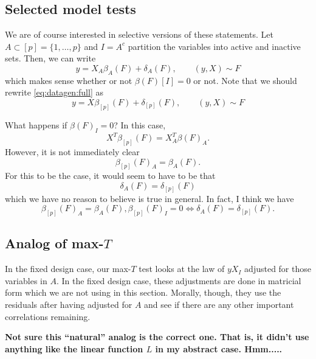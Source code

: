\documentclass{article}
\begin{document}
\subsection{Selected model tests}

We are of course interested in selective versions of these statements.
Let $A \subset [p]=\{1, \dots, p\}$ and $I=A^c$ partition
the variables into active and inactive sets.
Then, we can write
\begin{equation}
\label{eq:datagen}
y = X_A\beta_A(F) +\delta_A(F), \qquad (y, X) \sim F
\end{equation}
which makes sense whether or not $\beta(F)[I]=0$ or not. Note that
we should rewrite \eqref{eq:datagen:full} as
\begin{equation}
\label{eq:datagen}
y = X\beta_{[p]}(F) +\delta_{[p]}(F), \qquad (y, X) \sim F
\end{equation}


What happens if $\beta(F)_I=0$? In this case,
$$
X^T\beta_{[p]}(F) = X_A^T\beta(F)_A.
$$
However, it is not immediately clear 
$$
\beta_{[p]}(F)_A=\beta_A(F).
$$
For this to be the case, it would seem to have to be that
$$
\delta_A(F)=\delta_{[p]}(F)
$$
which we have no reason to believe is true in general. In fact, I think
we have
$$
\beta_{[p]}(F)_A = \beta_A(F), \beta_{[p]}(F)_I=0 \iff \delta_A(F)=\delta_{[p]}(F).
$$

\subsection{Analog of max-$T$}

In the fixed design case, our max-$T$ test looks at the law of
$yX_I$ adjusted for those variables in $A$. In the
fixed design case, these adjustments are done
in matricial form which we are not using in this section.
Morally, though, they use the residuals after having adjusted for $A$
and see if there are any other important correlations remaining.

{\bf Not sure this ``natural'' analog is the correct one.
That is, it didn't use anything like the linear
function $L$ in my abstract case. Hmm.....}
\end{document}
